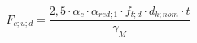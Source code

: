 \documentclass[12pt]{article}
\begin{document}
\begin{displaymath}
F_{c;u;d} = \frac {2,5 \cdot \alpha_c \cdot \alpha_{red;1} \cdot f_{t;d} \cdot d_{k;nom} \cdot t} {\gamma_M}
\end{displaymath}
\end{document}
